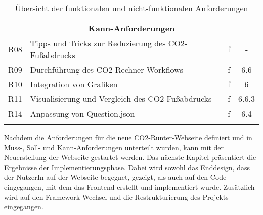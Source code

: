 \begin{longtable}{|c|l|c|c|}
    \hline
    \multicolumn{4}{|c|}{\textbf{Kann-Anforderungen}}                                                           \\
    \hline
    R08                  & Tipps und Tricks zur Reduzierung des CO2-Fußabdrucks & f            & -              \\
    \hline
    R09                  & Durchführung des CO2-Rechner-Workflows               & f            & 6.6            \\
    \hline
    R10                  & Integration von Grafiken                             & f            & 6              \\
    \hline
    R11                  & Visualisierung und Vergleich des CO2-Fußabdrucks     & f            & 6.6.3          \\
    \hline
    R14                  & Anpassung von Question.json                          & f            & 6.4            \\
    \hline
    \caption{Übersicht der funktionalen und nicht-funktionalen Anforderungen}
    \label{table:definied-tasks}
\end{longtable}


Nachdem die Anforderungen für die neue CO2-Runter-Webseite definiert und in Muss-, Soll- und Kann-Anforderungen unterteilt wurden, kann mit der Neuerstellung der Webseite gestartet werden. Das nächste Kapitel präsentiert die Ergebnisse der Implementierungsphase. Dabei wird sowohl das Enddesign, dass der NutzerIn auf der Webseite begegnet, gezeigt, als auch auf den Code eingegangen, mit dem das Frontend erstellt und implementiert wurde. Zusätzlich wird auf den Framework-Wechsel und die Restrukturierung des Projekts eingegangen.
